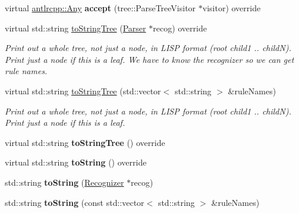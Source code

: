 \begin{DoxyCompactItemize}
\item 
\mbox{\label{classantlr4_1_1RuleContext_a8188a57118653c6dcba7de466e572bfd}} 
virtual \hyperlink{structantlrcpp_1_1Any}{antlrcpp\+::\+Any} {\bfseries accept} (tree\+::\+Parse\+Tree\+Visitor $\ast$visitor) override
\item 
virtual std\+::string \hyperlink{classantlr4_1_1RuleContext_ac4ba5cd65bf384baf9c27be9b14ebcfb}{to\+String\+Tree} (\hyperlink{classantlr4_1_1Parser}{Parser} $\ast$recog) override
\begin{DoxyCompactList}\small\item\em Print out a whole tree, not just a node, in L\+I\+SP format (root child1 .. childN). Print just a node if this is a leaf. We have to know the recognizer so we can get rule names. \end{DoxyCompactList}\item 
virtual std\+::string \hyperlink{classantlr4_1_1RuleContext_abcf82cbd07b59781b819a315a862c5a1}{to\+String\+Tree} (std\+::vector$<$ std\+::string $>$ \&rule\+Names)
\begin{DoxyCompactList}\small\item\em Print out a whole tree, not just a node, in L\+I\+SP format (root child1 .. childN). Print just a node if this is a leaf. \end{DoxyCompactList}\item 
\mbox{\label{classantlr4_1_1RuleContext_ab94a4fb68e964f80eeeca75c24708742}} 
virtual std\+::string {\bfseries to\+String\+Tree} () override
\item 
\mbox{\label{classantlr4_1_1RuleContext_a44d95ea08da34f2539fb84c9386cc48f}} 
virtual std\+::string {\bfseries to\+String} () override
\item 
\mbox{\label{classantlr4_1_1RuleContext_a5d3400ab115874c8ae7c8bb9b23b88b6}} 
std\+::string {\bfseries to\+String} (\hyperlink{classantlr4_1_1Recognizer}{Recognizer} $\ast$recog)
\item 
\mbox{\label{classantlr4_1_1RuleContext_a73fb65c70dea4528092c6fe5122a04bf}} 
std\+::string {\bfseries to\+String} (const std\+::vector$<$ std\+::string $>$ \&rule\+Names)
\item 
\mbox{\label{classantlr4_1_1RuleContext_abe90e4ee8e178f95faf2fd2f36b292be}} 

\end{DoxyCompactItemize}
